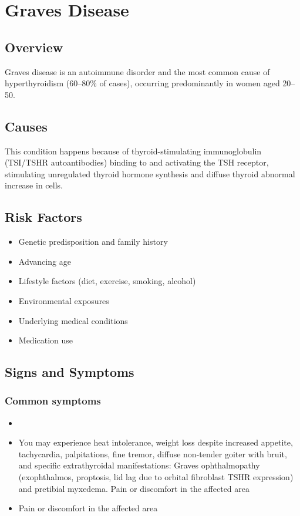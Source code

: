 \chapter{Graves Disease}
\label{sec:Graves Disease}

\section{Overview}
Graves disease is an autoimmune disorder and the most common cause of hyperthyroidism (60--80\% of cases), occurring predominantly in women aged 20--50.
\section{Causes}
This condition happens because of thyroid-stimulating immunoglobulin (TSI/TSHR autoantibodies) binding to and activating the TSH receptor, stimulating unregulated thyroid hormone synthesis and diffuse thyroid abnormal increase in cells.     
\section{Risk Factors}

\begin{itemize}[noitemsep]
  \item Genetic predisposition and family history
  \item Advancing age
  \item Lifestyle factors (diet, exercise, smoking, alcohol)
  \item Environmental exposures
  \item Underlying medical conditions
  \item Medication use
\end{itemize}
\section{Signs and Symptoms}

\subsection{Common symptoms}
\begin{itemize}[noitemsep]
  \item \item You may experience heat intolerance, weight loss despite increased appetite, tachycardia, palpitations, fine tremor, diffuse non-tender goiter with bruit, and specific extrathyroidal manifestations: Graves ophthalmopathy (exophthalmos, proptosis, lid lag due to orbital fibroblast TSHR expression) and pretibial myxedema. Pain or discomfort in the affected area    \item Pain or discomfort in the affected area
  \end{itemize}

